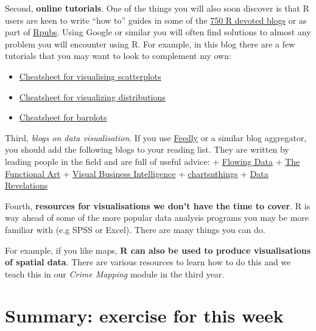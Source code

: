 \documentclass[
]{book}
\providecommand{\tightlist}{%
  \setlength{\itemsep}{0pt}\setlength{\parskip}{0pt}}
\begin{document}
Second, \textbf{online tutorials}. One of the things you will also soon discover is that R users are keen to write ``how to'' guides in some of the \href{http://www.r-bloggers.com/}{750 R devoted blogs} or as part of \href{https://rpubs.com/}{Rpubs}. Using Google or similar you will often find solutions to almost any problem you will encounter using R. For example, in this blog there are a few tutorials that you may want to look to complement my own:

\begin{itemize}
\tightlist
\item
  \href{http://rforpublichealth.blogspot.co.uk/2013/11/ggplot2-cheatsheet-for-scatterplots.html}{Cheatsheet for visualising scatterplots}\\
\item
  \href{http://rforpublichealth.blogspot.co.uk/2014/02/ggplot2-cheatsheet-for-visualizing.html}{Cheatsheet for visualizing distributions}\\
\item
  \href{http://rforpublichealth.blogspot.co.uk/2014_01_01_archive.html}{Cheatsheet for barplots}
\end{itemize}

Third, \emph{blogs on data visualisation}. If you use \href{https://feedly.com/index.html\#discover}{Feedly} or a similar blog aggregator, you should add the following blogs to your reading list. They are written by leading people in the field and are full of useful advice:
+ \href{http://flowingdata.com/}{Flowing Data}
+ \href{http://www.thefunctionalart.com/}{The Functional Art}
+ \href{http://www.perceptualedge.com/blog/}{Visual Business Intelligence}
+ \href{https://kpq.github.io/chartsnthings/}{chartsnthings}
+ \href{http://www.datarevelations.com/category/blog}{Data Revelations}

Fourth, \textbf{resources for visualisations we don't have the time to cover}. R is way ahead of some of the more popular data analysis programs you may be more familiar with (e.g SPSS or Excel). There are many things you can do.

For example, if you like maps, \textbf{R can also be used to produce visualisations of spatial data}. There are various resources to learn how to do this and we teach this in our \emph{Crime Mapping} module in the third year.

\section{Summary: exercise for this week}\label{summary-exercise-for-this-week-2}
\end{document}
